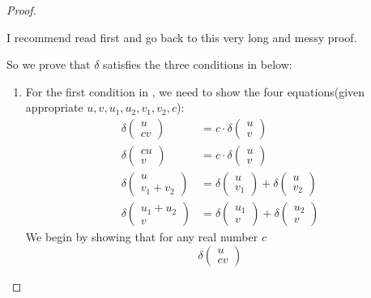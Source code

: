 \begin{proof}
\begin{note}
I recommend read  first and go back to this very long and messy proof.
\end{note}

So we prove that \(\delta\) satisfies the three conditions in  below:
\begin{enumerate}
\item For the first condition in , we need to show the four equations(given appropriate \(u, v, u_1, u_2, v_1, v_2, c\)):
\begin{align*}
    \delta \begin{pmatrix} u \\ cv \end{pmatrix}
    & = c \cdot \delta \begin{pmatrix} u \\ v \end{pmatrix} \\
    \delta \begin{pmatrix} cu \\ v \end{pmatrix}
    & = c \cdot \delta \begin{pmatrix} u \\ v \end{pmatrix} \\
    \delta \begin{pmatrix} u \\ v_1 + v_2 \end{pmatrix}
    & = \delta \begin{pmatrix} u \\ v_1 \end{pmatrix}
      + \delta \begin{pmatrix} u \\ v_2 \end{pmatrix} \\
    \delta \begin{pmatrix} u_1 + u_2 \\ v \end{pmatrix}
    & = \delta \begin{pmatrix} u_1 \\ v \end{pmatrix}
      + \delta \begin{pmatrix} u_2 \\ v \end{pmatrix}
\end{align*}
We begin by showing that for any real number \(c\)
\[
    \delta \begin{pmatrix} u \\ cv \end{pmatrix}
\]
\end{enumerate}
\end{proof}
